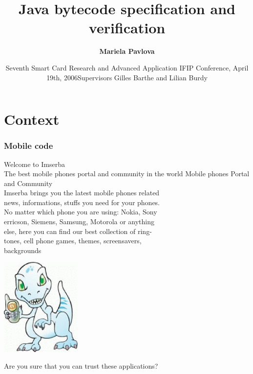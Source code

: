 \documentclass{beamer}
\title[]{Java bytecode specification and verification}
\author[mariela.pavlova@sophia.inria.fr]{\textbf{Mariela Pavlova}}
\date[CARDIS'06]{Seventh Smart Card Research and Advanced Application IFIP Conference, April 19th, 2006}
\date[INRIA Sophia Antipolis ]{Supervisors Gilles Barthe and Lilian Burdy}
\begin{document}
\begin{frame}
\titlepage
\end{frame}





\newcommand{\wpi}{\mbox{\rm\textit{wp}}}%
\newcommand{\Pred}{\mbox{\rm\texttt{Pred}}}
\newcommand{\program}{\mbox{\rm\texttt{P}}}%
\newcommand{\Method}{\mbox{\rm\texttt{Method}}}%
\newcommand{\methodd}{\mbox{\rm\textsf{meth}}}

%    



\section{Context}
\begin{frame}[shrink]
\frametitle{Mobile code}
Welcome to Imserba\bigskip\\

The best mobile phones portal and community in the world
Mobile phones Portal and Community\bigskip\\

Imserba brings you the latest mobile phones related \\
news, informations, stuffs you need for your phones. \\
No matter which phone you are using: Nokia, Sony\\
erricson, Siemens, Samsung, Motorola or anything\\ 
else, here you can find our best collection of ring- \\
tones, cell phone games, themes, screensavers,\\
backgrounds
\begin{center}
\includegraphics[width=4cm]{figs/beestje.ps}
\end{center}
\alert{Are you sure that you can trust these applications?}
\end{frame}
\end{document}
